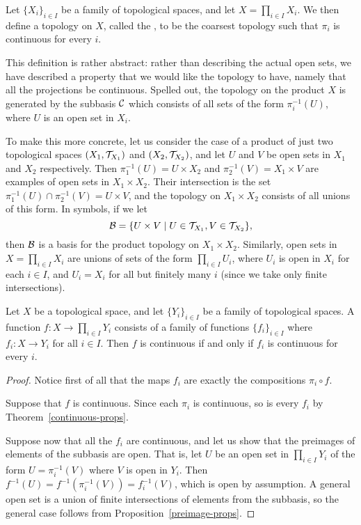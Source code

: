 \begin{defn}
  Let $\{ X_i \}_{i \in I}$ be a family of topological spaces, and let $X = \prod_{i \in I} X_i$. We then define a topology on $X$, called the , to be the coarsest topology such that $\pi_i$ is continuous for every $i$.
\end{defn}
This definition is rather abstract: rather than describing the actual open sets, we have described a property that we would like the topology to have, namely that all the projections be continuous. Spelled out, the topology on the product $X$ is generated by the subbasis $\mathcal{C}$ which consists of all sets of the form $\pi_i^{-1}(U)$, where $U$ is an open set in $X_i$.

To make this more concrete, let us consider the case of a product of just two topological spaces $(X_1,\mathcal{T}_{X_1})$ and $(X_2,\mathcal{T}_{X_2})$, and let $U$ and $V$ be open sets in $X_1$ and $X_2$ respectively. Then $\pi_1^{-1}(U) = U \times X_2$ and $\pi_2^{-1}(V) = X_1 \times V$ are examples of open sets in $X_1 \times X_2$. Their intersection is the set $\pi_1^{-1}(U) \cap \pi_2^{-1}(V) = U \times V$, and the topology on $X_1 \times X_2$ consists of all unions of this form. In symbols, if we let
\[
  \mathcal{B} = \{ U \times V \mid U \in \mathcal{T}_{X_1}, V \in \mathcal{T}_{X_2} \},
\]
then $\mathcal{B}$ is a basis for the product topology on $X_1 \times X_2$. Similarly, open sets in $X = \prod_{i \in I} X_i$ are unions of sets of the form $\prod_{i \in I} U_i$, where $U_i$ is open in $X_i$ for each $i \in I$, and $U_i = X_i$ for all but finitely many $i$ (since we take only finite intersections).

\begin{thm}
  Let $X$ be a topological space, and let $\{Y_i\}_{i \in I}$ be a family of topological spaces. A function $f : X \to \prod_{i \in I} Y_i$ consists of a family of functions $\{f_i\}_{i \in I}$ where $f_i : X \to Y_i$ for all $i \in I$. Then $f$ is continuous if and only if $f_i$ is continuous for every $i$.
\end{thm}
\begin{proof}
  Notice first of all that the maps $f_i$ are exactly the compositions $\pi_i \circ f$.
  
  Suppose that $f$ is continuous. Since each $\pi_i$ is continuous, so is every $f_i$ by Theorem~\ref{continuous-props}.
  
  Suppose now that all the $f_i$ are continuous, and let us show that the preimages of elements of the subbasis are open. That is, let $U$ be an open set in $\prod_{i \in I} Y_i$ of the form $U = \pi_i^{-1}(V)$ where $V$ is open in $Y_i$. Then $f^{-1}(U) = f^{-1}(\pi_i^{-1}(V)) = f_i^{-1}(V)$, which is open by assumption. A general open set is a union of finite intersections of elements from the subbasis, so the general case follows from Proposition~\ref{preimage-props}.
\end{proof}

